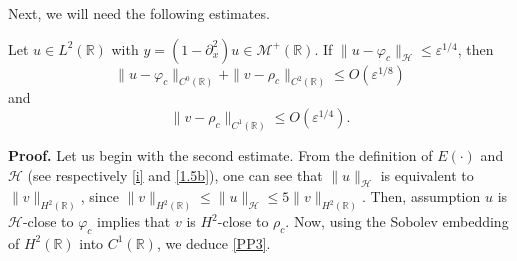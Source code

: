 \documentclass[10pt,a4paper,twoside]{article}
\begin{document}
Next, we will need the following estimates.






\begin{Lem}\label{Lemma PP1}
Let $u\in L^{2}(\mathbb{R})$ with $y=(1-\partial^{2}_{x})u\in\mathcal{M}^{+}(\mathbb{R})$. If 
$\|u-\varphi_{c}\|_{\mathcal{H}}\le \varepsilon^{1/4}$, then
\begin{equation}
\|u-\varphi_{c}\|_{C^{0}(\mathbb{R})}+ \|v-\rho_{c}\|_{C^{2}(\mathbb{R})}\le O(\varepsilon^{1/8})
\label{PP2}
\end{equation}
and 
\begin{equation}
\|v-\rho_{c}\|_{C^{1}(\mathbb{R})}\le O(\varepsilon^{1/4}).
\label{PP3}
\end{equation}
\end{Lem}
\noindent
\textbf{Proof.}
Let us begin with the second estimate. From the definition of $E(\cdot)$ and $\mathcal{H}$ 
(see respectively \eqref{i} and \eqref{1.5b}), one can see that $\|u\|_{\mathcal{H}}$ is equivalent to $\|v\|_{H^{2}(\mathbb{R})}$, since $\|v\|_{H^{2}(\mathbb{R})}\le\|u\|_{\mathcal{H}}\le 
5\|v\|_{H^{2}(\mathbb{R})}$. Then, assumption $u$ is $\mathcal{H}$-close to $\varphi_{c}$ implies that $v$ is $H^{2}$-close to $\rho_{c}$. Now, using the Sobolev embedding of $H^{2}(\mathbb{R})$ into $C^{1}(\mathbb{R})$, we deduce \eqref{PP3}.
\end{document}

